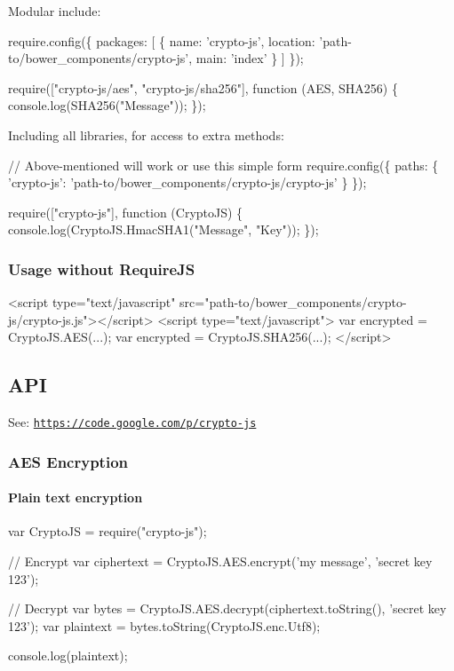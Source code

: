 Modular include\+:


\begin{DoxyCode}
require.config(\{
    packages: [
        \{
            name: 'crypto-js',
            location: 'path-to/bower\_components/crypto-js',
            main: 'index'
        \}
    ]
\});

require(["crypto-js/aes", "crypto-js/sha256"], function (AES, SHA256) \{
    console.log(SHA256("Message"));
\});
\end{DoxyCode}


Including all libraries, for access to extra methods\+:


\begin{DoxyCode}
// Above-mentioned will work or use this simple form
require.config(\{
    paths: \{
        'crypto-js': 'path-to/bower\_components/crypto-js/crypto-js'
    \}
\});

require(["crypto-js"], function (CryptoJS) \{
    console.log(CryptoJS.HmacSHA1("Message", "Key"));
\});
\end{DoxyCode}


\subsubsection*{Usage without Require\+JS}


\begin{DoxyCode}
<script type="text/javascript" src="path-to/bower\_components/crypto-js/crypto-js.js"></script>
<script type="text/javascript">
    var encrypted = CryptoJS.AES(...);
    var encrypted = CryptoJS.SHA256(...);
</script>
\end{DoxyCode}


\subsection*{A\+PI}

See\+: \href{https://code.google.com/p/crypto-js}{\tt https\+://code.\+google.\+com/p/crypto-\/js}

\subsubsection*{A\+ES Encryption}

\paragraph*{Plain text encryption}


\begin{DoxyCode}
var CryptoJS = require("crypto-js");

// Encrypt
var ciphertext = CryptoJS.AES.encrypt('my message', 'secret key 123');

// Decrypt
var bytes  = CryptoJS.AES.decrypt(ciphertext.toString(), 'secret key 123');
var plaintext = bytes.toString(CryptoJS.enc.Utf8);

console.log(plaintext);
\end{DoxyCode}


